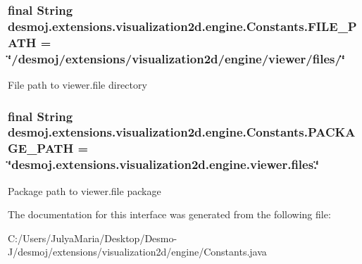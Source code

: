\subsubsection[{F\-I\-L\-E\-\_\-\-P\-A\-T\-H}]{\setlength{\rightskip}{0pt plus 5cm}final String desmoj.\-extensions.\-visualization2d.\-engine.\-Constants.\-F\-I\-L\-E\-\_\-\-P\-A\-T\-H = \char`\"{}/desmoj/extensions/visualization2d/engine/viewer/files/\char`\"{}\hspace{0.3cm}{\ttfamily [static]}}\label{interfacedesmoj_1_1extensions_1_1visualization2d_1_1engine_1_1_constants_a4a9401b2874cd3cb15875f7c4a70fed2}
File path to viewer.\-file directory 
\subsubsection[{P\-A\-C\-K\-A\-G\-E\-\_\-\-P\-A\-T\-H}]{\setlength{\rightskip}{0pt plus 5cm}final String desmoj.\-extensions.\-visualization2d.\-engine.\-Constants.\-P\-A\-C\-K\-A\-G\-E\-\_\-\-P\-A\-T\-H = \char`\"{}desmoj.\-extensions.\-visualization2d.\-engine.\-viewer.\-files.\char`\"{}\hspace{0.3cm}{\ttfamily [static]}}\label{interfacedesmoj_1_1extensions_1_1visualization2d_1_1engine_1_1_constants_a5afffc0203b535c831c4147ab48e7520}
Package path to viewer.\-file package 

The documentation for this interface was generated from the following file\-:\begin{DoxyCompactItemize}
\item 
C\-:/\-Users/\-Julya\-Maria/\-Desktop/\-Desmo-\/\-J/desmoj/extensions/visualization2d/engine/Constants.\-java\end{DoxyCompactItemize}
